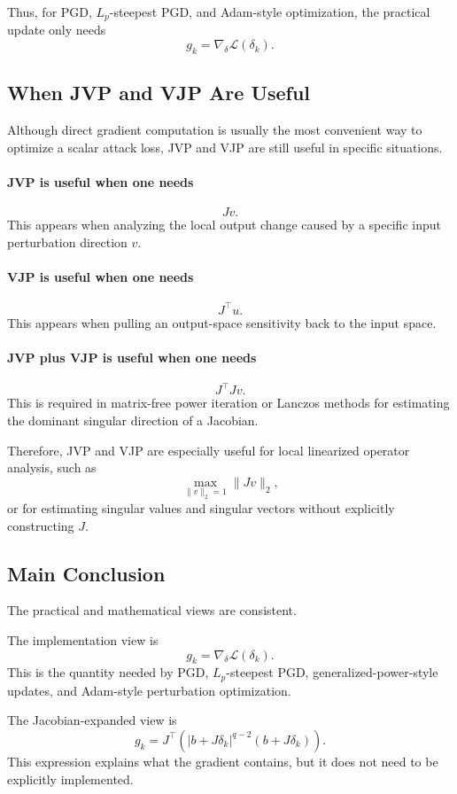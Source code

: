 \documentclass{article}
\begin{document}
Thus, for PGD, $L_p$-steepest PGD, and Adam-style optimization, the practical update only needs
\[
g_k=\nabla_\delta \mathcal L(\delta_k).
\]

\subsection{When JVP and VJP Are Useful}

Although direct gradient computation is usually the most convenient way to optimize a scalar attack loss, JVP and VJP are still useful in specific situations.

\paragraph{JVP is useful when one needs}
\[
Jv.
\]
This appears when analyzing the local output change caused by a specific input perturbation direction $v$.

\paragraph{VJP is useful when one needs}
\[
J^\top u.
\]
This appears when pulling an output-space sensitivity back to the input space.

\paragraph{JVP plus VJP is useful when one needs}
\[
J^\top Jv.
\]
This is required in matrix-free power iteration or Lanczos methods for estimating the dominant singular direction of a Jacobian.

Therefore, JVP and VJP are especially useful for local linearized operator analysis, such as
\[
\max_{\|v\|_2=1}\|Jv\|_2,
\]
or for estimating singular values and singular vectors without explicitly constructing $J$.

\subsection{Main Conclusion}

The practical and mathematical views are consistent.

The implementation view is
\[
\boxed{
g_k=\nabla_\delta \mathcal L(\delta_k).
}
\]
This is the quantity needed by PGD, $L_p$-steepest PGD, generalized-power-style updates, and Adam-style perturbation optimization.

The Jacobian-expanded view is
\[
\boxed{
g_k
=
J^\top
\left(
|b+J\delta_k|^{q-2}
(b+J\delta_k)
\right).
}
\]
This expression explains what the gradient contains, but it does not need to be explicitly implemented.
\end{document}
